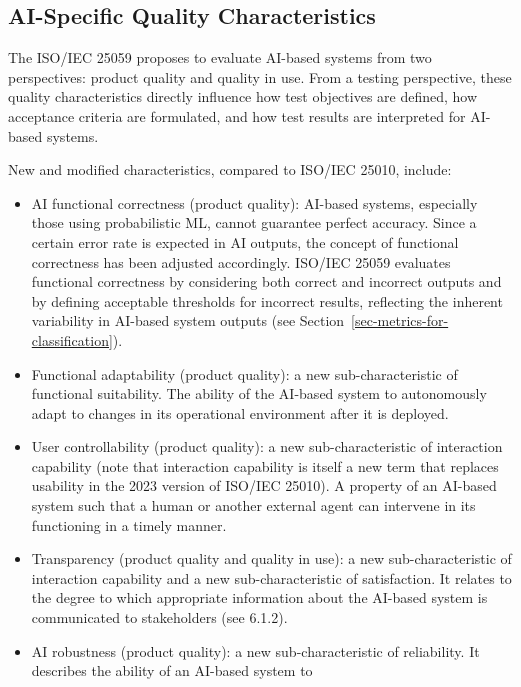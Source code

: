 \documentclass[
  letterpaper,
  DIV=11,
  numbers=noendperiod,
  oneside]{scrreprt}
\begin{document}
\begin{tcolorbox}
\subsection{AI-Specific Quality
Characteristics}\label{ai-specific-quality-characteristics}

The ISO/IEC 25059 proposes to evaluate AI-based systems from two
perspectives: product quality and quality in use. From a testing
perspective, these quality characteristics directly influence how test
objectives are defined, how acceptance criteria are formulated, and how
test results are interpreted for AI-based systems.

New and modified characteristics, compared to ISO/IEC 25010, include:

\begin{itemize}
\item
  AI functional correctness{} (product quality): AI-based systems,
  especially those using probabilistic ML, cannot guarantee perfect
  accuracy. Since a certain error rate is expected in AI outputs, the
  concept of functional correctness has been adjusted accordingly.
  ISO/IEC 25059 evaluates functional correctness by considering both
  correct and incorrect outputs and by defining acceptable thresholds
  for incorrect results, reflecting the inherent variability in AI-based
  system outputs (see Section~\ref{sec-metrics-for-classification}).
\item
  Functional adaptability{} (product quality): a new sub-characteristic
  of functional suitability. The ability of the AI-based system to
  autonomously adapt to changes in its operational environment after it
  is deployed.
\item
  User controllability{} (product quality): a new sub-characteristic of
  interaction capability (note that interaction capability is itself a
  new term that replaces usability in the 2023 version of ISO/IEC
  25010). A property of an AI-based system such that a human or another
  external agent can intervene in its functioning in a timely manner.
\item
  Transparency{} (product quality and quality in use): a new
  sub-characteristic of interaction capability and a new
  sub-characteristic of satisfaction. It relates to the degree to which
  appropriate information about the AI-based system is communicated to
  stakeholders (see 6.1.2).
\item
  AI robustness{} (product quality): a new sub-characteristic of
  reliability. It describes the ability of an AI-based system to

\end{itemize}
\end{tcolorbox}
\end{document}
